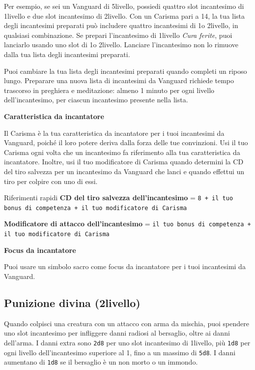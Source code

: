 \documentclass[a4paper,10pt,twoside,twocolumn,openany,bg=full,nodeprecatedcode]{dndbook}
\begin{document}
Per esempio, se sei un Vanguard di 5\degree livello, possiedi quattro slot incantesimo di 1\degree livello e due slot incantesimo di 2\degree livello.
Con un Carisma pari a 14, la tua lista degli incantesimi preparati può includere quattro incantesimi di 1\degree o 2\degree livello, in qualsiasi combinazione.
Se prepari l'incantesimo di 1\degree livello \emph{Cura ferite}, puoi lanciarlo usando uno slot di 1\degree o 2\degree livello.
Lanciare l'incantesimo non lo rimuove dalla tua lista degli incantesimi preparati.

Puoi cambiare la tua lista degli incantesimi preparati quando completi un riposo lungo.
Preparare una nuova lista di incantesimi da Vanguard richiede tempo trascorso in preghiera e meditazione: almeno 1 minuto per ogni livello dell'incantesimo, per ciascun incantesimo presente nella lista.

\textbf{Caratteristica da incantatore}

Il Carisma è la tua caratteristica da incantatore per i tuoi incantesimi da Vanguard, poiché il loro potere deriva dalla forza delle tue convinzioni.
Usi il tuo Carisma ogni volta che un incantesimo fa riferimento alla tua caratteristica da incantatore.
Inoltre, usi il tuo modificatore di Carisma quando determini la CD del tiro salvezza per un incantesimo da Vanguard che lanci e quando effettui un tiro per colpire con uno di essi.

\begin{DndComment}[color=PhbLightCyan]{Riferimenti rapidi}
  \textbf{CD del tiro salvezza dell'incantesimo} = \texttt{8 + il tuo bonus di competenza + il tuo modificatore di Carisma}

  \textbf{Modificatore di attacco dell'incantesimo} = \texttt{il tuo bonus di competenza + il tuo modificatore di Carisma}
\end{DndComment}

\textbf{Focus da incantatore}

Puoi usare un simbolo sacro come focus da incantatore per i tuoi incantesimi da Vanguard.

\subsection{Punizione divina (2\degree livello)}

Quando colpisci una creatura con un attacco con arma da mischia, puoi spendere uno slot incantesimo per infliggere danni radiosi al bersaglio, oltre ai danni dell'arma.
I danni extra sono \texttt{2d8} per uno slot incantesimo di 1\degree livello, più \texttt{1d8} per ogni livello dell'incantesimo superiore al 1\degree, fino a un massimo di \texttt{5d8}.
I danni aumentano di \texttt{1d8} se il bersaglio è un non morto o un immondo.
\end{document}
